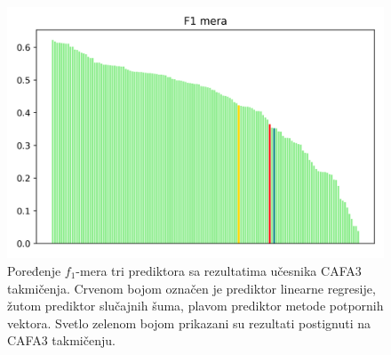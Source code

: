 \begin{figure}[H]
	\centering
	\includegraphics[width=\textwidth]{Figures/cafa_poredjenje.png}
	\caption{Poređenje $f_1$-mera tri prediktora sa rezultatima učesnika  CAFA3 takmičenja. Crvenom bojom označen je prediktor linearne regresije, žutom prediktor slučajnih šuma, plavom prediktor metode potpornih vektora. Svetlo zelenom bojom prikazani su rezultati postignuti na CAFA3 takmičenju.}
	\label{fig:cafa}
\end{figure}


